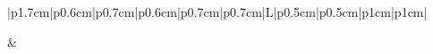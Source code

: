 \documentclass[review]{elsarticle}
\begin{document}
\begin{table}[tp]

	
\vspace*{-4cm}

\centering
\caption[short tbl1 table1]{The datasets description and results of \# of selected variables by the filter methods}
\label{tab:tbl1}
\hspace*{-2cm}
\begin{tabular}{|p{1.7cm}|p{0.6cm}|p{0.7cm}|p{0.6cm}|p{0.7cm}|p{0.7cm}|L|p{0.5cm}|p{0.5cm}|p{1cm}|p{1cm}|}
	

	\hline 
	 &
	 \\ 


\end{tabular}
\end{table}
\end{document}
